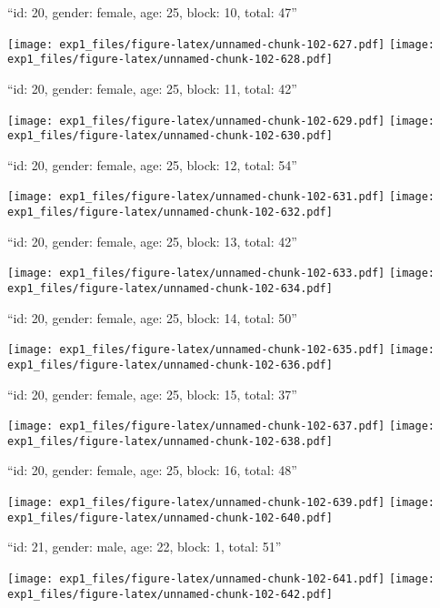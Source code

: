 \documentclass[11pt,,]{article}
\begin{document}
\newpage
[1] 

``id: 20, gender: female, age: 25, block: 10, total: 47''

\texttt{[image: exp1\_files/figure-latex/unnamed-chunk-102-627.pdf]}
\texttt{[image: exp1\_files/figure-latex/unnamed-chunk-102-628.pdf]}

\newpage
[1] 

``id: 20, gender: female, age: 25, block: 11, total: 42''

\texttt{[image: exp1\_files/figure-latex/unnamed-chunk-102-629.pdf]}
\texttt{[image: exp1\_files/figure-latex/unnamed-chunk-102-630.pdf]}

\newpage
[1] 

``id: 20, gender: female, age: 25, block: 12, total: 54''

\texttt{[image: exp1\_files/figure-latex/unnamed-chunk-102-631.pdf]}
\texttt{[image: exp1\_files/figure-latex/unnamed-chunk-102-632.pdf]}

\newpage
[1] 

``id: 20, gender: female, age: 25, block: 13, total: 42''

\texttt{[image: exp1\_files/figure-latex/unnamed-chunk-102-633.pdf]}
\texttt{[image: exp1\_files/figure-latex/unnamed-chunk-102-634.pdf]}

\newpage
[1] 

``id: 20, gender: female, age: 25, block: 14, total: 50''

\texttt{[image: exp1\_files/figure-latex/unnamed-chunk-102-635.pdf]}
\texttt{[image: exp1\_files/figure-latex/unnamed-chunk-102-636.pdf]}

\newpage
[1] 

``id: 20, gender: female, age: 25, block: 15, total: 37''

\texttt{[image: exp1\_files/figure-latex/unnamed-chunk-102-637.pdf]}
\texttt{[image: exp1\_files/figure-latex/unnamed-chunk-102-638.pdf]}

\newpage
[1] 

``id: 20, gender: female, age: 25, block: 16, total: 48''

\texttt{[image: exp1\_files/figure-latex/unnamed-chunk-102-639.pdf]}
\texttt{[image: exp1\_files/figure-latex/unnamed-chunk-102-640.pdf]}

\newpage
[1] 

``id: 21, gender: male, age: 22, block: 1, total: 51''

\texttt{[image: exp1\_files/figure-latex/unnamed-chunk-102-641.pdf]}
\texttt{[image: exp1\_files/figure-latex/unnamed-chunk-102-642.pdf]}
\end{document}
